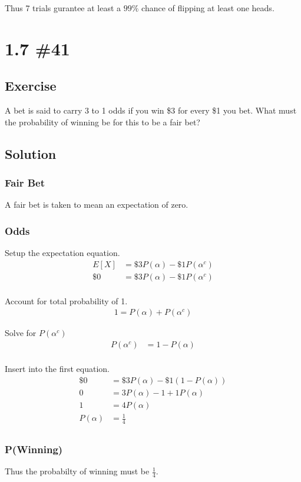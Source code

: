 \documentclass[12pt]{article}
\begin{document}
Thus 7 trials gurantee at least a $99\%$ chance of flipping at least one heads.

\section{1.7 \#41} 
\subsection{Exercise}
A bet is said to carry 3 to 1 odds if you win \$3 for every \$1 you bet. What must the probability of winning be for this
to be a fair bet?

\subsection{Solution}
\subsubsection{Fair Bet}
A fair bet is taken to mean an expectation of zero.

\subsubsection{Odds}
Setup the expectation equation.
\begin{align*}
E[X] & = \$3P(\alpha)-\$1P(\alpha^c)\\
\$0 & = \$3P(\alpha)-\$1P(\alpha^c)\\
\end{align*}

Account for total probability of 1.
\begin{align*}
1 = P(\alpha)+P(\alpha^c)
\end{align*}

Solve for $P(\alpha^c)$
\begin{align*}
P(\alpha^c) & = 1-P(\alpha)\\
\end{align*}

Insert into the first equation.
\begin{align*}
\$0 &= \$3P(\alpha)-\$1(1-P(\alpha))\\
0 &= 3P(\alpha)-1+1P(\alpha)\\
1 &= 4P(\alpha)\\
P(\alpha) &= \frac{1}{4}\\
\end{align*}

\subsubsection{P(Winning)}
Thus the probabilty of winning must be $\frac{1}{4}$.
\end{document}
